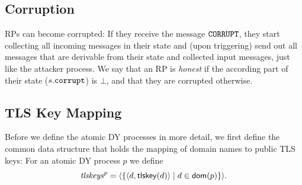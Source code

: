   
 
  
 
  
  
  \subsection{Corruption}
  RPs can become corrupted: If they receive the message
  $\mathtt{CORRUPT}$, they start collecting all incoming messages in their state
  and (upon triggering) send out all messages that are derivable from
  their state and collected input messages, just like the attacker
  process. We say that an RP is \emph{honest} if the according
  part of their state ($s.\mathtt{corrupt}$) is $\bot$, and that they are
  corrupted otherwise. 
  
  
  \subsection{TLS Key Mapping}\label{app:common-data-structures}
  Before we define the atomic DY processes in more detail, we first
  define the common data structure that holds the mapping of domain
  names to public TLS keys: For an atomic DY process $p$ we define
  \[\mathit{tlskeys}^p = \langle\left\{\langle d, \mathsf{tlskey}(d)\rangle \mid d \in \mathsf{dom}(p)\right\}\rangle.\]
 
